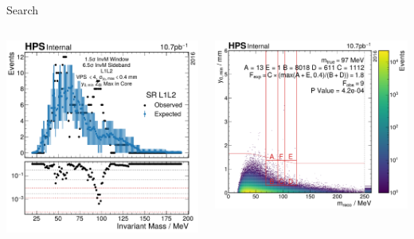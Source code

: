 \documentclass[aspectratio=169]{beamer}
\begin{document}
\begin{frame}{Search}
  \begin{columns}
    \begin{column}{0.45\textwidth}
      \centering
      \includegraphics[width=\textwidth]{../figures/hps/analysis/results/search.pdf}
    \end{column}
    \begin{column}{0.55\textwidth}
      \centering
      \includegraphics[width=\textwidth]{../figures/hps/analysis/results/search-min-p-val.pdf}
    \end{column}
  \end{columns}
\end{frame}
\end{document}
